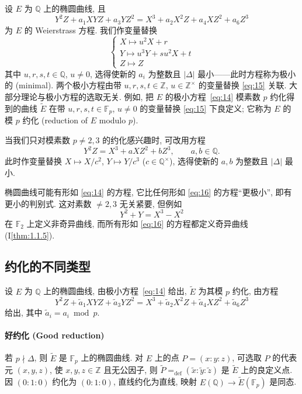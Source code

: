 设 $E$ 为 $\mathbb{Q}$ 上的椭圆曲线, 且
\begin{equation} \label{eq:14}
Y^2Z + a_1XYZ + a_3YZ^2 = X^3 + a_2X^2Z + a_4XZ^2 + a_6Z^3
\tag{14}
\end{equation}
为 $E$ 的 Weierstrass 方程. 我们作变量替换
\begin{equation} \label{eq:15}
\begin{cases}
X\mapsto u^2X + r\\
Y\mapsto u^3Y + su^2X + t\\
Z\mapsto Z
\end{cases}
\tag{15}
\end{equation}
其中 $u,r,s,t\in\mathbb{Q}$, $u\neq 0$, 选得使新的 $a_i$ 为整数且 $|\Delta|$ 最小——此时方程称为极小的 (minimal). 两个极小方程由带 $u,r,s,t\in\mathbb{Z}$, $u\in\mathbb{Z}^{\times}$ 的变量替换 \eqref{eq:15} 关联. 大部分理论与极小方程的选取无关. 例如, 把 $E$ 的极小方程~\eqref{eq:14} 模素数 $p$ 约化得到的曲线 $\tilde{E}$ 在带 $u,r,s,t\in\mathbb{F}_p$, $u\neq 0$ 的变量替换 \eqref{eq:15} 下良定义; 它称为 $E$ 的模 $p$ 约化 (reduction of $E$ modulo $p$).

当我们只对模素数 $p\neq 2,3$ 的约化感兴趣时, 可改用方程
\begin{equation} \label{eq:16}
Y^2Z = X^3 + aXZ^2 + bZ^3, \qquad a,b\in\mathbb{Q}.
\tag{16}
\end{equation}
此时作变量替换 $X\mapsto X/c^2$, $Y\mapsto Y/c^3$ ($c\in\mathbb{Q}^{\times}$), 选得使新的 $a,b$ 为整数且 $|\Delta|$ 最小.

椭圆曲线可能有形如 \eqref{eq:14} 的方程, 它比任何形如 \eqref{eq:16} 的方程``更极小'', 即有更小的判别式. 这对素数 $\neq 2,3$ 无关紧要, 但例如
\[
Y^2 + Y = X^3 - X^2
\]
在 $\mathbb{F}_2$ 上定义非奇异曲线, 而所有形如 \eqref{eq:16} 的方程都定义奇异曲线 (I\ref{thm:1.1.5}).

\subsection*{约化的不同类型}

设 $E$ 为 $\mathbb{Q}$ 上的椭圆曲线, 由极小方程~\eqref{eq:14} 给出, $\tilde{E}$ 为其模 $p$ 约化, 由方程
\[
Y^2Z + \tilde{a}_1XYZ + \tilde{a}_3YZ^2 = X^3 + \tilde{a}_2X^2Z + \tilde{a}_4XZ^2 + \tilde{a}_6Z^3
\]
给出, 其中 $\tilde{a}_i = a_i\bmod p$.

\paragraph{好约化 (Good reduction)}
若 $p\nmid\Delta$, 则 $\tilde{E}$ 是 $\mathbb{F}_p$ 上的椭圆曲线. 对 $E$ 上的点 $P = (x:y:z)$, 可选取 $P$ 的代表元 $(x,y,z)$, 使 $x,y,z\in\mathbb{Z}$ 且无公因子, 则 $\tilde{P} \mathrel{=_{\mathrm{def}}} (\tilde{x}:\tilde{y}:\tilde{z})$ 是 $\tilde{E}$ 上的良定义点. 因 $(0:1:0)$ 约化为 $(0:1:0)$, 直线约化为直线, 映射 $E(\mathbb{Q})\to\tilde{E}(\mathbb{F}_p)$ 是同态.

